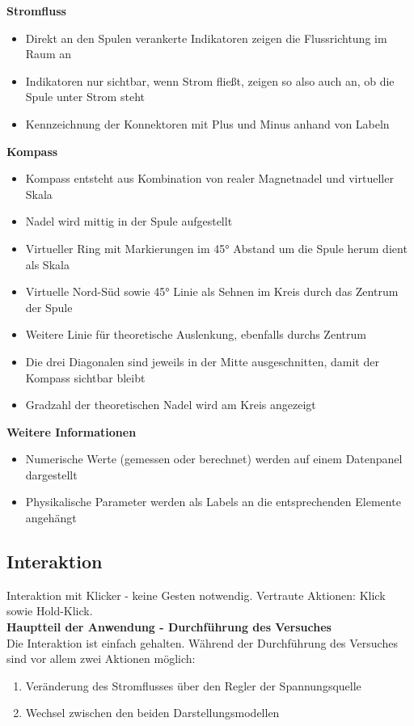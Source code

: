 \textbf{Stromfluss}
\begin{itemize}[topsep=-2px]
	\setlength{\itemsep}{-5pt}
	\item Direkt an den Spulen verankerte Indikatoren zeigen die Flussrichtung im Raum an
	\item Indikatoren nur sichtbar, wenn Strom fließt, zeigen so also auch an, ob die Spule unter Strom steht
	\item Kennzeichnung der Konnektoren mit Plus und Minus anhand von Labeln
\end{itemize}
\vspace{8px}

\textbf{Kompass}
\begin{itemize}[topsep=-2px]
	\setlength{\itemsep}{-5pt}
	\item Kompass entsteht aus Kombination von realer Magnetnadel und virtueller Skala
	\item Nadel wird mittig in der Spule aufgestellt
	\item Virtueller Ring mit Markierungen im 45° Abstand um die Spule herum dient als Skala	
	\item Virtuelle Nord-Süd sowie 45° Linie als Sehnen im Kreis durch das Zentrum der Spule
	\item Weitere Linie für theoretische Auslenkung, ebenfalls durchs Zentrum
	\item Die drei Diagonalen sind jeweils in der Mitte ausgeschnitten, damit der Kompass sichtbar bleibt
	\item Gradzahl der theoretischen Nadel wird am Kreis angezeigt
\end{itemize}
\vspace{8px}

\textbf{Weitere Informationen}
\begin{itemize}[topsep=-2px]
	\setlength{\itemsep}{-5pt}
	\item Numerische Werte (gemessen oder berechnet) werden auf einem Datenpanel dargestellt
	\item Physikalische Parameter werden als Labels an die entsprechenden Elemente angehängt
\end{itemize}
\vspace{4px}

\subsection{Interaktion}
Interaktion mit Klicker - keine Gesten notwendig. Vertraute Aktionen: Klick sowie Hold-Klick.\\
\textbf{Hauptteil der Anwendung - Durchführung des Versuches}\\
Die Interaktion ist einfach gehalten. Während der Durchführung des Versuches sind vor allem zwei Aktionen möglich:
\begin{enumerate}[topsep=-2px]
	\setlength{\itemsep}{-5pt}
	\item Veränderung des Stromflusses über den Regler der Spannungsquelle
	\item Wechsel zwischen den beiden Darstellungsmodellen
\end{enumerate}
\vspace{4px}

